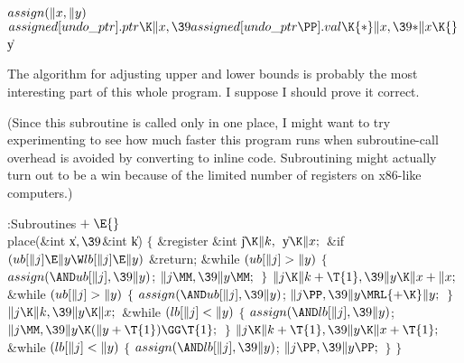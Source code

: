 \Y\B\4\D$\\{assign}(\|x,\|y)$ \5
$\\{assigned}[\\{undo\_ptr}].\\{ptr}\K\|x,\39\\{assigned}[\\{undo\_ptr}\PP].%
\\{val}\K{*}\|x,\39{*}\|x\K{}$\|y\par
\fi

The algorithm for adjusting upper and lower bounds is
probably the most
interesting part of this whole program. I suppose I should prove it correct.

(Since this subroutine is called only in one place, I might want to try
experimenting to see how much faster this program runs when subroutine-call
overhead is avoided by converting to inline code. Subroutining might actually
turn out to be a win because of the limited number of registers
on x86-like computers.)

\Y\B\4:Subroutines\X${}\mathrel+\E{}$\6
\\{place}(\&{int} \|x${},\39{}$\&{int} \|k)\6
${}\{{}$\1\6
\&{register} \&{int} \|j${}\K\|k,{}$ \|y${}\K\|x;{}$\7
\&{if} ${}(\\{ub}[\|j]\E\|y\W\\{lb}[\|j]\E\|y){}$\1\5
\&{return};\2\6
\&{while} ${}(\\{ub}[\|j]>\|y){}$\5
${}\{{}$\1\6
${}\\{assign}({\AND}\\{ub}[\|j],\39\|y){}$;\6
${}\|j\MM,\39\|y\MM;{}$\6
\4${}\}{}$\2\6
${}\|j\K\|k+\T{1},\39\|y\K\|x+\|x;{}$\6
\&{while} ${}(\\{ub}[\|j]>\|y){}$\5
${}\{{}$\1\6
${}\\{assign}({\AND}\\{ub}[\|j],\39\|y){}$;\6
${}\|j\PP,\39\|y\MRL{+{\K}}\|y;{}$\6
\4${}\}{}$\2\6
${}\|j\K\|k,\39\|y\K\|x;{}$\6
\&{while} ${}(\\{lb}[\|j]<\|y){}$\5
${}\{{}$\1\6
${}\\{assign}({\AND}\\{lb}[\|j],\39\|y){}$;\6
${}\|j\MM,\39\|y\K(\|y+\T{1})\GG\T{1};{}$\6
\4${}\}{}$\2\6
${}\|j\K\|k+\T{1},\39\|y\K\|x+\T{1};{}$\6
\&{while} ${}(\\{lb}[\|j]<\|y){}$\5
${}\{{}$\1\6
${}\\{assign}({\AND}\\{lb}[\|j],\39\|y){}$;\6
${}\|j\PP,\39\|y\PP;{}$\6
\4${}\}{}$\2\6
\4${}\}{}$\2\par
\fi

